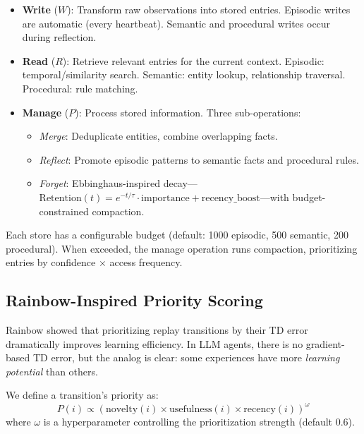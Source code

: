 \documentclass[letterpaper]{article}
\begin{document}
\begin{itemize}[leftmargin=1.5em,itemsep=2pt]
  \item \textbf{Write} ($W$): Transform raw observations into stored entries. Episodic writes are automatic (every heartbeat). Semantic and procedural writes occur during reflection.
  \item \textbf{Read} ($R$): Retrieve relevant entries for the current context. Episodic: temporal/similarity search. Semantic: entity lookup, relationship traversal. Procedural: rule matching.
  \item \textbf{Manage} ($P$): Process stored information. Three sub-operations:
  \begin{itemize}[leftmargin=1em,itemsep=1pt]
    \item \emph{Merge}: Deduplicate entities, combine overlapping facts.
    \item \emph{Reflect}: Promote episodic patterns to semantic facts and procedural rules.
    \item \emph{Forget}: Ebbinghaus-inspired decay---$\text{Retention}(t) = e^{-t/\tau} \cdot \text{importance} + \text{recency\_boost}$---with budget-constrained compaction.
  \end{itemize}
\end{itemize}

Each store has a configurable budget (default: 1000 episodic, 500 semantic, 200 procedural). When exceeded, the manage operation runs compaction, prioritizing entries by confidence $\times$ access frequency.

\subsection{Rainbow-Inspired Priority Scoring}
\label{sec:rainbow}

Rainbow \citep{hessel2018rainbow} showed that prioritizing replay transitions by their TD error dramatically improves learning efficiency. In LLM agents, there is no gradient-based TD error, but the analog is clear: some experiences have more \emph{learning potential} than others.

We define a transition's priority as:
\begin{equation}
  P(i) \propto \left(\text{novelty}(i) \times \text{usefulness}(i) \times \text{recency}(i)\right)^{\omega}
\label{eq:priority}
\end{equation}
where $\omega$ is a hyperparameter controlling the prioritization strength (default 0.6).
\end{document}
